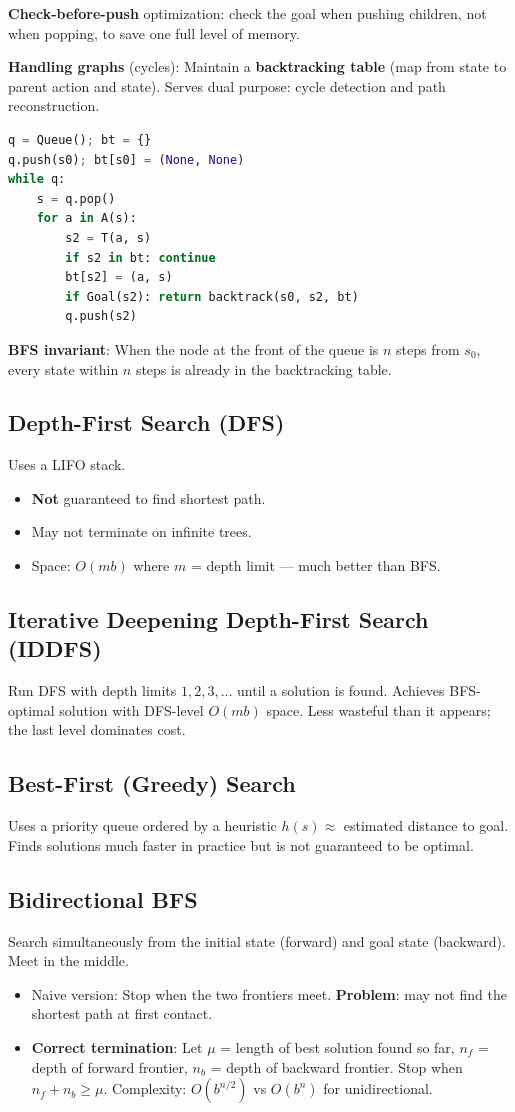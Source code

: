 \documentclass[11pt]{article}
\begin{document}
\textbf{Check-before-push} optimization: check the goal when pushing children, not when popping, to save one full level of memory.

\textbf{Handling graphs} (cycles): Maintain a \textbf{backtracking table} (map from state to parent action and state). Serves dual purpose: cycle detection and path reconstruction.

\begin{lstlisting}[language=Python]
q = Queue(); bt = {}
q.push(s0); bt[s0] = (None, None)
while q:
    s = q.pop()
    for a in A(s):
        s2 = T(a, s)
        if s2 in bt: continue
        bt[s2] = (a, s)
        if Goal(s2): return backtrack(s0, s2, bt)
        q.push(s2)
\end{lstlisting}

\textbf{BFS invariant}: When the node at the front of the queue is $n$ steps from $s_0$, every state within $n$ steps is already in the backtracking table.

\subsection{Depth-First Search (DFS)}
Uses a LIFO stack.
\begin{itemize}
  \item \textbf{Not} guaranteed to find shortest path.
  \item May not terminate on infinite trees.
  \item Space: $O(mb)$ where $m$ = depth limit --- much better than BFS.
\end{itemize}

\subsection{Iterative Deepening Depth-First Search (IDDFS)}
Run DFS with depth limits $1, 2, 3, \ldots$ until a solution is found. Achieves BFS-optimal solution with DFS-level $O(mb)$ space. Less wasteful than it appears; the last level dominates cost.

\subsection{Best-First (Greedy) Search}
Uses a priority queue ordered by a heuristic $h(s) \approx$ estimated distance to goal. Finds solutions much faster in practice but is not guaranteed to be optimal.

\subsection{Bidirectional BFS}
Search simultaneously from the initial state (forward) and goal state (backward). Meet in the middle.
\begin{itemize}
  \item Naive version: Stop when the two frontiers meet. \textbf{Problem}: may not find the shortest path at first contact.
  \item \textbf{Correct termination}: Let $\mu$ = length of best solution found so far, $n_f$ = depth of forward frontier, $n_b$ = depth of backward frontier. Stop when $n_f + n_b \geq \mu$. Complexity: $O(b^{n/2})$ vs $O(b^n)$ for unidirectional.
\end{itemize}
\end{document}
